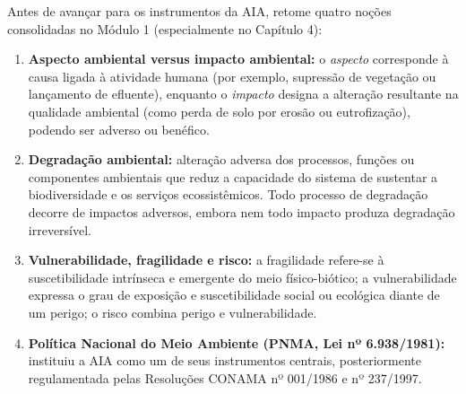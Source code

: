\begin{capRevisao}
  Antes de avançar para os instrumentos da AIA, retome quatro noções consolidadas no Módulo 1 (especialmente no Capítulo 4):
  \begin{enumerate}[leftmargin=1.6em, itemsep=2.5pt]
    \item \textbf{Aspecto ambiental versus impacto ambiental:} o \emph{aspecto} corresponde à causa ligada à atividade humana (por exemplo, supressão de vegetação ou lançamento de efluente), enquanto o \emph{impacto} designa a alteração resultante na qualidade ambiental (como perda de solo por erosão ou eutrofização), podendo ser adverso ou benéfico.
    \item \textbf{Degradação ambiental:} alteração adversa dos processos, funções ou componentes ambientais que reduz a capacidade do sistema de sustentar a biodiversidade e os serviços ecossistêmicos. Todo processo de degradação decorre de impactos adversos, embora nem todo impacto produza degradação irreversível.
    \item \textbf{Vulnerabilidade, fragilidade e risco:} a fragilidade refere-se à suscetibilidade intrínseca e emergente do meio físico-biótico; a vulnerabilidade expressa o grau de exposição e suscetibilidade social ou ecológica diante de um perigo; o risco combina perigo e vulnerabilidade.
    \item \textbf{Política Nacional do Meio Ambiente (PNMA, Lei nº 6.938/1981):} instituiu a AIA como um de seus instrumentos centrais, posteriormente regulamentada pelas Resoluções CONAMA nº 001/1986 e nº 237/1997.
  \end{enumerate}
\end{capRevisao}


